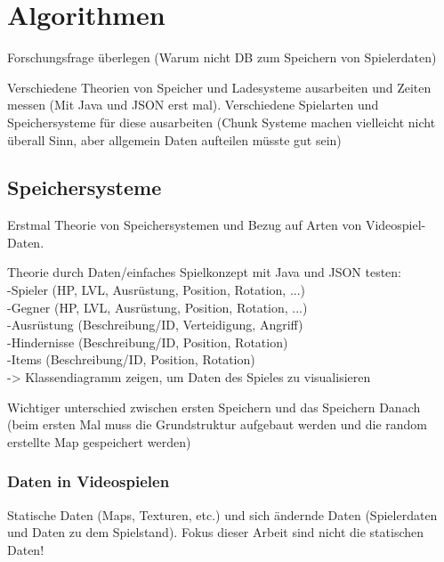 \chapter{Algorithmen}\label{ch:algorithmen}
Forschungsfrage überlegen (Warum nicht DB zum Speichern von Spielerdaten)

Verschiedene Theorien von Speicher und Ladesysteme ausarbeiten und Zeiten 
messen (Mit Java und JSON erst mal). Verschiedene Spielarten und Speichersysteme
für diese ausarbeiten (Chunk Systeme machen vielleicht nicht überall Sinn, aber 
allgemein Daten aufteilen müsste gut sein)


\section{Speichersysteme}
Erstmal Theorie von Speichersystemen und Bezug auf Arten von Videospiel-Daten.

Theorie durch Daten/einfaches Spielkonzept mit Java und JSON testen:\\
-Spieler (HP, LVL, Ausrüstung, Position, Rotation, ...)\\
-Gegner (HP, LVL, Ausrüstung, Position, Rotation, ...)\\
-Ausrüstung (Beschreibung/ID, Verteidigung, Angriff)\\
-Hindernisse (Beschreibung/ID, Position, Rotation)\\
-Items (Beschreibung/ID, Position, Rotation)\\
-> Klassendiagramm zeigen, um Daten des Spieles zu visualisieren

Wichtiger unterschied zwischen ersten Speichern und das Speichern Danach
(beim ersten Mal muss die Grundstruktur aufgebaut werden und die random
erstellte Map gespeichert werden)



\subsection{Daten in Videospielen}
Statische Daten (Maps, Texturen, etc.) und sich ändernde Daten (Spielerdaten und 
Daten zu dem Spielstand). Fokus dieser Arbeit sind nicht die statischen Daten!

